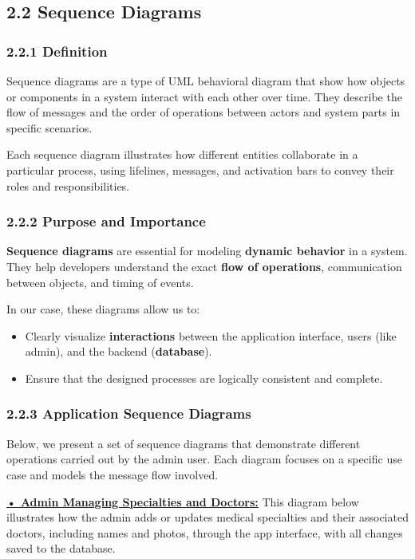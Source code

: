 \documentclass[12pt]{report}
\begin{document}
\subsection*{2.2 Sequence Diagrams}

\subsubsection{2.2.1 Definition}
Sequence diagrams are a type of UML behavioral diagram that show how objects or components in a system interact with each other over time. They describe the flow of messages and the order of operations between actors and system parts in specific scenarios.

Each sequence diagram illustrates how different entities collaborate in a particular process, using lifelines, messages, and activation bars to convey their roles and responsibilities.

\subsubsection*{2.2.2 Purpose and Importance}

\textbf{Sequence diagrams} are essential for modeling \textbf{dynamic behavior} in a system. They help developers understand the exact \textbf{flow of operations}, communication between objects, and timing of events.

In our case, these diagrams allow us to:
\begin{itemize}
	\item Clearly visualize \textbf{interactions} between the application interface, users (like admin), and the backend (\textbf{database}).
	\item Ensure that the designed processes are logically consistent and complete.
\end{itemize}


\subsubsection*{2.2.3 Application Sequence Diagrams}
Below, we present a set of sequence diagrams that demonstrate different operations carried out by the admin user. Each diagram focuses on a specific use case and models the message flow involved.

\vspace{1cm}

\noindent\underline{\textbf{• Admin Managing Specialties and Doctors:}}
This diagram below illustrates how the admin adds or updates medical specialties and their associated doctors, including names and photos, through the app interface, with all changes saved to the database.
\end{document}
